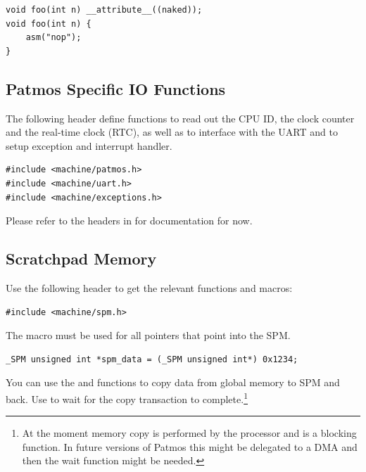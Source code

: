 \begin{verbatim}
void foo(int n) __attribute__((naked));
void foo(int n) {
    asm("nop");
}
\end{verbatim}


\subsection{Patmos Specific IO Functions}

The following header define functions to read out the CPU ID, the clock counter and the real-time clock (RTC), as well as to
interface with the UART and to setup exception and interrupt handler.

\begin{verbatim}
#include <machine/patmos.h>
#include <machine/uart.h>
#include <machine/exceptions.h>
\end{verbatim}

Please refer to the headers in  for documentation for now.


\subsection{Scratchpad Memory}

Use the following header to get the relevant functions and macros:

\begin{verbatim}
#include <machine/spm.h>
\end{verbatim}

The  macro must be used for all pointers that point into the SPM.

\begin{verbatim}
_SPM unsigned int *spm_data = (_SPM unsigned int*) 0x1234;
\end{verbatim}

You can use the  and  functions
to copy data from global memory to SPM and back. Use  to
wait for the copy transaction to complete.\footnote{At the moment memory copy is
performed by the processor and is a blocking function. In future versions of Patmos
this might be delegated to a DMA and then the wait function might be needed.}




